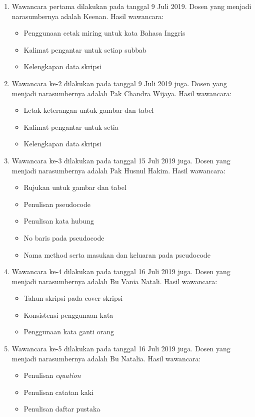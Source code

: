 \begin{enumerate}
	\item Wawancara pertama dilakukan pada tanggal 9 Juli 2019. Dosen yang menjadi narasumbernya adalah Keenan. Hasil wawancara:
		
		\begin{itemize}
			\item Penggunaan cetak miring untuk kata Bahasa Inggris
			\item Kalimat pengantar untuk setiap subbab
			\item Kelengkapan data skripsi
		\end{itemize}
		
	\item Wawancara ke-2 dilakukan pada tanggal 9 Juli 2019 juga. Dosen yang menjadi narasumbernya adalah Pak Chandra Wijaya. Hasil wawancara:
	
		\begin{itemize}
			\item Letak keterangan untuk gambar dan tabel
			\item Kalimat pengantar untuk setia
			\item Kelengkapan data skripsi
		\end{itemize}
		
	\item Wawancara ke-3 dilakukan pada tanggal 15 Juli 2019 juga. Dosen yang menjadi narasumbernya adalah Pak Husnul Hakim. Hasil wawancara:
	
		\begin{itemize}
			\item Rujukan untuk gambar dan tabel
			\item Penulisan pseudocode
			\item Penulisan kata hubung
			\item No baris pada pseudocode
			\item Nama method serta masukan dan keluaran pada pseudocode
		\end{itemize}
		
	\item Wawancara ke-4 dilakukan pada tanggal 16 Juli 2019 juga. Dosen yang menjadi narasumbernya adalah Bu Vania Natali. Hasil wawancara:
	
		\begin{itemize}
			\item Tahun skripsi pada cover skripsi
			\item Konsistensi penggunaan kata
			\item Penggunaan kata ganti orang
		\end{itemize}
	
	\item Wawancara ke-5 dilakukan pada tanggal 16 Juli 2019 juga. Dosen yang menjadi narasumbernya adalah Bu Natalia. Hasil wawancara:
	
		\begin{itemize}
			\item Penulisan \textit{equation}
			\item Penulisan catatan kaki
			\item Penulisan daftar pustaka
		\end{itemize}
		
\end{enumerate}